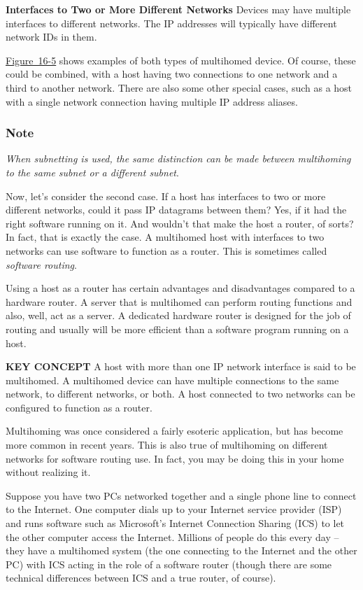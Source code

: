 {\textbf{Interfaces to Two or More Different Networks}} Devices may have
multiple interfaces to different networks.
The IP addresses will typically have different network IDs in them.

\protect\hyperlink{ch16s06.htmlux5cux23multihomed_devices_on_an_ip_internetwork}{Figure~16-5}
shows examples of both types of multihomed device. Of course, these
could be combined, with a host having two connections to one network and
a third to another network. There are also some other special cases,
such as a host with a single network connection having multiple IP
address aliases.

\subsubsection{Note}

{\emph{When subnetting is used, the same distinction can be made between
multihoming to the same subnet or a different subnet}}.

Now, let's consider the second case. If a host has interfaces to two or
more different networks, could it pass IP datagrams between them? Yes,
if it had the right software
running on it. And wouldn't that make the host a router, of sorts? In
fact, that is exactly the case. A multihomed host with interfaces to two
networks can use software to function as a router. This is sometimes
called \emph{software routing}.

Using a host as a router has certain advantages and disadvantages
compared to a hardware router. A server that is multihomed can perform
routing functions and also, well, act as a server. A dedicated hardware
router is designed for the job of routing and usually will be more
efficient than a software program running on a host.


{\textbf{KEY CONCEPT}} A host with more than one IP network interface is
said to be multihomed. A multihomed device can have multiple connections
to the same network, to different networks, or both. A host connected to
two networks can be configured to function as a router.

Multihoming was once considered a fairly esoteric application, but has
become more common in recent years. This is also true of multihoming on
different networks for software routing use. In fact, you may be doing
this in your home without realizing it.

Suppose you have two PCs networked together and a single phone line to
connect to the Internet. One computer dials up to your Internet service
provider (ISP) and runs software such as Microsoft's Internet
Connection Sharing (ICS) to
let the other computer access the Internet. Millions of people do this
every day -- they have a multihomed system (the one connecting to the
Internet and the other PC) with ICS acting in the role of a software
router (though there are some technical differences between ICS and a
true router, of course).


